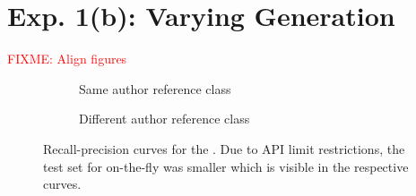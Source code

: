 \section{Exp. 1(b): Varying \Imp{} Generation}

\textcolor{red}{FIXME: Align figures}

\begin{figure}[H]
  \centering
  \begin{subfigure}{0.75\textwidth}
    \centering
    
    \caption{Same author reference class}
    \label{fig:student_essays_same_author}
  \end{subfigure}
  \hfill
  \begin{subfigure}{0.75\textwidth}
    \centering
    
    \caption{Different author reference class}
    \label{fig:student_essays_different_author}
  \end{subfigure}
  \caption{Recall-precision curves for the \dataStudent{}. 
Due to API limit restrictions, the test set for on-the-fly was smaller which is visible in the respective curves.
  }
  \label{fig:diff_imp_gen_student_essays}
\end{figure}